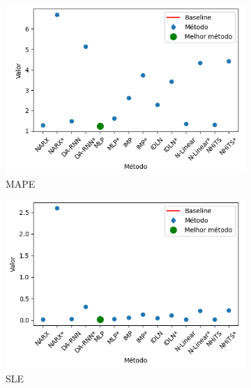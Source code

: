 \begin{figure}[htbp]
	\centering
	\begin{subfigure}[b]{0.3\textwidth}
		\centering
		\includegraphics[width=\textwidth]{figuras/mape_takens_brasil_oil_results_test.png}
		\caption{\ac{MAPE}}
		\label{fig:mape_takens_brasil_oil_results_test}
	\end{subfigure}
	\hfill
	\begin{subfigure}[b]{0.3\textwidth}
		\centering
		\includegraphics[width=\textwidth]{figuras/sle_takens_brasil_oil_results_test.png}
		\caption{\ac{SLE}}
		\label{fig:sle_takens_brasil_oil_results_test}
	\end{subfigure}
	\hfill
	\begin{subfigure}[b]{0.3\textwidth}
		\centering

\end{subfigure}
\end{figure}
